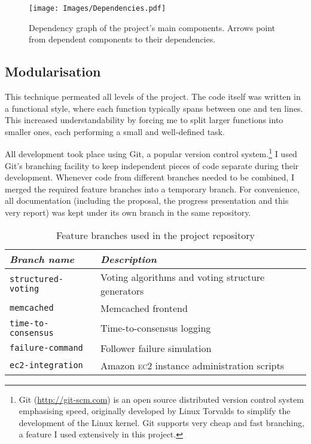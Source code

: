 \documentclass[draft,11pt,chapterprefix=true,toc=bibliography,numbers=noendperiod,
               footnotes=multiple,twoside]{scrreprt}
\newcommand{\ECC}[0]{\textsc{ec}2 }
\begin{document}
\begin{figure}[h]
    \centering
    \texttt{[image: Images/Dependencies.pdf]}
    \caption{Dependency graph of the project's main components. Arrows point from dependent components to their dependencies.}
    \label{fig:dependencies}
\end{figure}

\subsection{Modularisation}

This technique permeated all levels of the project. The code itself was written in a functional style, where each function typically spans between one and ten lines. This increased understandability by forcing me to split larger functions into smaller ones, each performing a small and well-defined task.

All development took place using Git, a popular version control system.\footnote{Git (\url{http://git-scm.com}) is an open source distributed version control system emphasising speed, originally developed by Linux Torvalds to simplify the development of the Linux kernel. Git supports very cheap and fast branching, a feature I used extensively in this project.} I used Git's branching facility to keep independent pieces of code separate during their development. Whenever code from different branches needed to be combined, I merged the required feature branches into a temporary branch. For convenience, all documentation (including the proposal, the progress presentation and this very report) was kept under its own branch in the same repository.

\begin{table}[h]
    \centering
    \begin{tabularx}{\textwidth}{l X}
        \toprule
        \textit{Branch name} & \textit{Description} \\
        \midrule
        \texttt{structured-voting} & Voting algorithms and voting structure generators \\
        \texttt{memcached} & Memcached frontend \\
        \texttt{time-to-consensus} & Time-to-consensus logging \\
        \texttt{failure-command} & Follower failure simulation \\
        \texttt{ec2-integration} & Amazon \ECC instance administration scripts \\
        \bottomrule
    \end{tabularx}
    \caption{Feature branches used in the project repository}
    \label{tab:branches}
\end{table}
\end{document}
